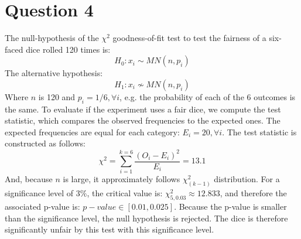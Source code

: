 \documentclass{article}
\begin{document}
\maketitle

\section{Question 4}
The null-hypothesis of the \(\chi^2\) goodness-of-fit test to test the fairness of a six-faced dice rolled 120 times is:\[
H_0: x_i \sim MN(n,p_i)
\]The alternative hypothesis:\[
H_1: x_i \not\sim MN(n,p_i)
\]
Where \(n\) is 120 and \(p_i=1/6, \forall i\), e.g. the probability of each of the 6 outcomes is the same. To evaluate if the experiment uses a fair dice, we compute the test statistic, which compares the observed frequencies to the expected ones. The expected frequencies are equal for each category: \(E_i=20, \forall i\).  The test statistic is constructed as follows:\[
\chi^2 = \sum_{i=1}^{k=6} \frac{(O_i - E_i)^2}{E_i}=13.1
\]
And, because \(n\) is large, it approximately follows \(\chi^2_{(k-1)}\) distribution. For a significance level of \(3\%\), the critical value is: \(\chi^2_{5, 0.03} \approx 12.833\), and therefore the associated p-value is: \(p-value \in [0.01,0.025]\). Because the p-value is smaller than the significance level, the null hypothesis is rejected. The dice is therefore significantly unfair by this test with this significance level.
\end{document}
